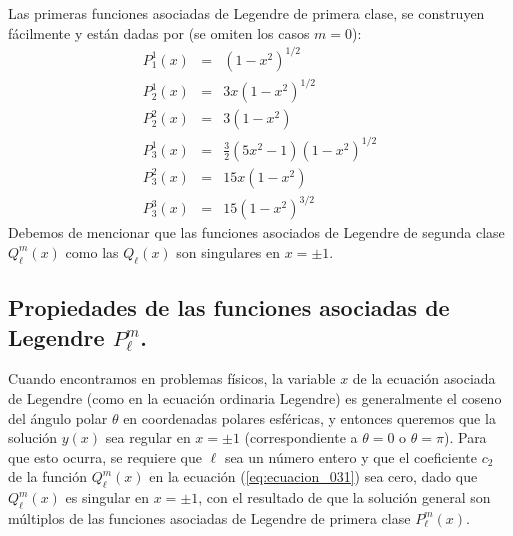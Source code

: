 Las primeras funciones asociadas de Legendre de primera clase, se construyen fácilmente y están dadas por (se omiten los casos $m=0$):
\begin{eqnarray}
P_{1}^{1} (x) &=& (1-x^{2})^{1/2} \nonumber \\
P_{2}^{1} (x) &=& 3x (1-x^{2})^{1/2} \nonumber \\
P_{2}^{2} (x) &=& 3(1-x^{2}) \nonumber \\
P_{3}^{1} (x) &=& \frac{3}{2}(5x^{2}-1)(1-x^{2})^{1/2} \nonumber \\
P_{3}^{2} (x) &=& 15x (1-x^{2}) \nonumber \\
P_{3}^{3} (x) &=& 15 (1-x^{2})^{3/2} \nonumber
\end{eqnarray}
Debemos de mencionar que las funciones asociados de Legendre de segunda clase $Q_{\ell}^{m} (x)$ como las $Q_{\ell}(x)$ son singulares en $x= \pm 1$.
\subsection*{Propiedades de las funciones asociadas de Legendre $P_{\ell}^{m}$.}
Cuando encontramos en problemas físicos, la variable $x$ de la ecuación asociada de Legendre (como en la ecuación ordinaria Legendre) es generalmente el coseno del ángulo polar $\theta$ en coordenadas polares esféricas, y entonces queremos que la solución $y (x)$ sea regular en $x = \pm 1$ (correspondiente a $\theta = 0$ o $\theta = \pi$). Para que esto ocurra, se requiere que $\ell$ sea un número entero y que el coeficiente $c_{2}$ de la función $Q_{\ell}^{m} (x)$ en la ecuación (\ref{eq:ecuacion_031}) sea cero, dado que $Q_{\ell}^{m}(x)$ es singular en $x = \pm 1$, con el resultado de que la solución general son múltiplos de las funciones asociadas de Legendre de primera clase $P_{\ell}^{m}(x)$.
